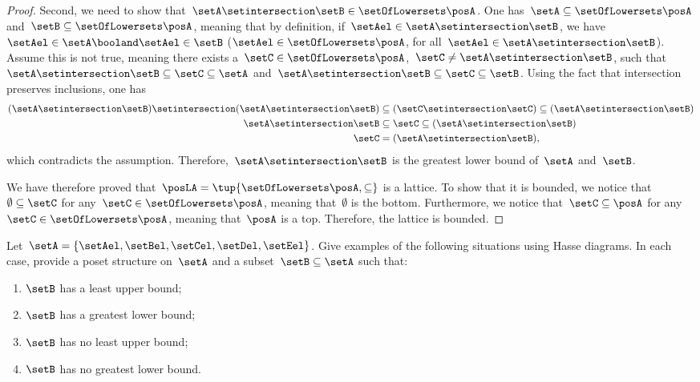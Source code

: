 \begin{proof}
	Second, we need to show that~$\setA \setintersection \setB\in \setOfLowersets \posA$.
	One has~$\setA \subseteq \setOfLowersets \posA$ and~$\setB\subseteq \setOfLowersets \posA$, meaning that by definition, if~$\setAel\in \setA\setintersection \setB$, we have~$\setAel \in \setA\booland \setAel\in \setB$ ($\setAel\in \setOfLowersets \posA$, for all~$\setAel\in \setA \setintersection \setB$).
	Assume this is not true, meaning there exists a~$\setC\in \setOfLowersets \posA$,~$\setC\neq \setA\setintersection \setB$, such that~$\setA\setintersection \setB\subseteq \setC\subseteq \setA$ and~$\setA\setintersection \setB\subseteq \setC\subseteq \setB$.
	Using the fact that intersection preserves inclusions, one has
	\begin{equation}
		\begin{aligned}
			(\setA\setintersection \setB)
			\setintersection (\setA\setintersection \setB) & \subseteq (\setC \setintersection \setC) \subseteq (\setA\setintersection \setB) \\
			\setA\setintersection \setB                    & \subseteq \setC\subseteq (\setA\setintersection \setB)                           \\
			\setC                                          & =(\setA\setintersection \setB),
		\end{aligned}
	\end{equation}
	which contradicts the assumption.
	Therefore,~$\setA\setintersection \setB$ is the greatest lower bound of~$\setA$ and~$\setB$.

	We have therefore proved that~$\posLA=\tup{\setOfLowersets \posA,\subseteq}$ is a lattice.
	To show that it is bounded, we notice that~$\emptyset \subseteq \setC$ for any~$\setC\in \setOfLowersets \posA$, meaning that~$\emptyset$ is the bottom.
	Furthermore, we notice that~$\setC\subseteq \posA$ for any~$\setC\in \setOfLowersets \posA$, meaning that~$\posA$ is a top.
	Therefore, the lattice is bounded.
\end{proof}

\vfill

\begin{gradedexercise}
	\label{ex:UpperLowerBounds}
	Let~$\setA = \{\setAel, \setBel, \setCel, \setDel, \setEel \}$.
	Give examples of the following situations using Hasse diagrams.
	In each case, provide a poset structure on~$\setA$ and a subset~$\setB \subseteq \setA$ such that:
	\begin{enumerate}
		\item $\setB$ has a least upper bound;
		\item $\setB$ has a greatest lower bound;
		\item $\setB$ has no least upper bound;
		\item $\setB$ has no greatest lower bound.
	\end{enumerate}
\end{gradedexercise}

